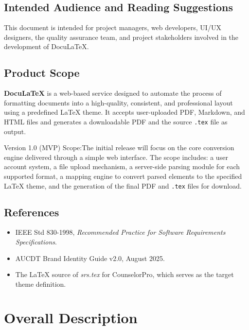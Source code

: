 \documentclass[a4paper, 11pt]{article}
\begin{document}
\subsection{Intended Audience and Reading Suggestions}
This document is intended for project managers, web developers, UI/UX designers, the quality assurance team, and project stakeholders involved in the development of DocuLaTeX.

\subsection{Product Scope}
\begin{cardcontainer}[title={Product Scope}]
    \textbf{DocuLaTeX} is a web-based service designed to automate the process of formatting documents into a high-quality, consistent, and professional layout using a predefined LaTeX theme. It accepts user-uploaded PDF, Markdown, and HTML files and generates a downloadable PDF and the source \texttt{.tex} file as output.

    \vspace{1em}
    \poppinssemibold\color{AUCDTPrimaryText}Version 1.0 (MVP) Scope:\normalfont The initial release will focus on the core conversion engine delivered through a simple web interface. The scope includes: a user account system, a file upload mechanism, a server-side parsing module for each supported format, a mapping engine to convert parsed elements to the specified LaTeX theme, and the generation of the final PDF and \texttt{.tex} files for download.
\end{cardcontainer}

\subsection{References}
\begin{itemize}[label={\color{AUCDTBurgundy}\faBook}]
    \item IEEE Std 830-1998, \textit{Recommended Practice for Software Requirements Specifications}.
    \item AUCDT Brand Identity Guide v2.0, August 2025.
    \item The LaTeX source of \textit{srs.tex} for CounselorPro, which serves as the target theme definition.
\end{itemize}

\section{Overall Description}
\end{document}
